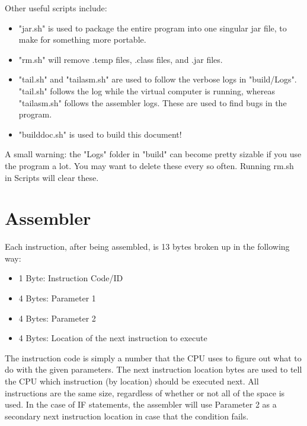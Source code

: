 \documentclass[12pt]{article}
\begin{document}
\vspace{12pt}

Other useful scripts include:

\begin{itemize}

\item
"jar.sh" is used to package the entire program into one singular jar file, to make for something more portable.

\item
"rm.sh" will remove .temp files, .class files, and .jar files.

\item
"tail.sh" and "tailasm.sh" are used to follow the verbose logs in "build/Logs".
"tail.sh" follows the log while the virtual computer is running,
whereas "tailasm.sh" follows the assembler logs.
These are used to find bugs in the program.

\item
"builddoc.sh" is used to build this document!

\end{itemize}

A small warning: the "Logs" folder in "build" can become pretty sizable if you use the program a lot.
You may want to delete these every so often. Running rm.sh in Scripts will clear these.

\section{Assembler}

\vspace{12pt}

Each instruction, after being assembled, is 13 bytes broken up in the following way:
\begin{itemize}

\item
1 Byte: Instruction Code/ID

\item
4 Bytes: Parameter 1

\item
4 Bytes: Parameter 2

\item
4 Bytes: Location of the next instruction to execute

\end{itemize}

\vspace{12pt}

The instruction code is simply a number that the CPU uses to figure out what to do with the given parameters.
The next instruction location bytes are used to tell the CPU which instruction (by location) should be executed next.
All instructions are the same size, regardless of whether or not all of the space is used.
In the case of IF statements, the assembler will use Parameter 2 as a secondary next instruction location
in case that the condition fails.
\end{document}
